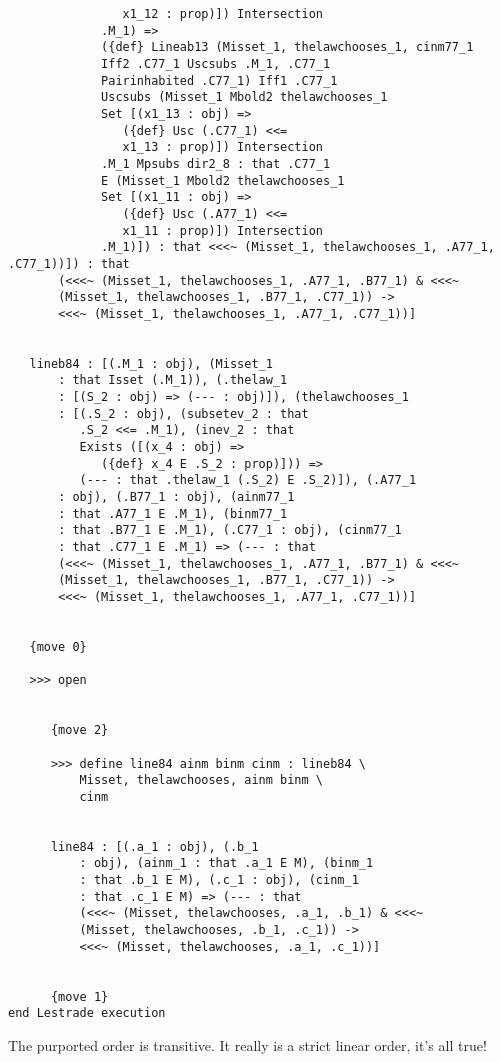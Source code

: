\documentclass[12pt]{article}
\begin{document}
\begin{verbatim}
                x1_12 : prop)]) Intersection 
             .M_1) => 
             ({def} Lineab13 (Misset_1, thelawchooses_1, cinm77_1 
             Iff2 .C77_1 Uscsubs .M_1, .C77_1 
             Pairinhabited .C77_1) Iff1 .C77_1 
             Uscsubs (Misset_1 Mbold2 thelawchooses_1 
             Set [(x1_13 : obj) => 
                ({def} Usc (.C77_1) <<= 
                x1_13 : prop)]) Intersection 
             .M_1 Mpsubs dir2_8 : that .C77_1 
             E (Misset_1 Mbold2 thelawchooses_1 
             Set [(x1_11 : obj) => 
                ({def} Usc (.A77_1) <<= 
                x1_11 : prop)]) Intersection 
             .M_1)]) : that <<<~ (Misset_1, thelawchooses_1, .A77_1, .C77_1))]) : that 
       (<<<~ (Misset_1, thelawchooses_1, .A77_1, .B77_1) & <<<~ 
       (Misset_1, thelawchooses_1, .B77_1, .C77_1)) -> 
       <<<~ (Misset_1, thelawchooses_1, .A77_1, .C77_1))]


   lineb84 : [(.M_1 : obj), (Misset_1 
       : that Isset (.M_1)), (.thelaw_1 
       : [(S_2 : obj) => (--- : obj)]), (thelawchooses_1 
       : [(.S_2 : obj), (subsetev_2 : that 
          .S_2 <<= .M_1), (inev_2 : that 
          Exists ([(x_4 : obj) => 
             ({def} x_4 E .S_2 : prop)])) => 
          (--- : that .thelaw_1 (.S_2) E .S_2)]), (.A77_1 
       : obj), (.B77_1 : obj), (ainm77_1 
       : that .A77_1 E .M_1), (binm77_1 
       : that .B77_1 E .M_1), (.C77_1 : obj), (cinm77_1 
       : that .C77_1 E .M_1) => (--- : that 
       (<<<~ (Misset_1, thelawchooses_1, .A77_1, .B77_1) & <<<~ 
       (Misset_1, thelawchooses_1, .B77_1, .C77_1)) -> 
       <<<~ (Misset_1, thelawchooses_1, .A77_1, .C77_1))]


   {move 0}

   >>> open


      {move 2}

      >>> define line84 ainm binm cinm : lineb84 \
          Misset, thelawchooses, ainm binm \
          cinm


      line84 : [(.a_1 : obj), (.b_1 
          : obj), (ainm_1 : that .a_1 E M), (binm_1 
          : that .b_1 E M), (.c_1 : obj), (cinm_1 
          : that .c_1 E M) => (--- : that 
          (<<<~ (Misset, thelawchooses, .a_1, .b_1) & <<<~ 
          (Misset, thelawchooses, .b_1, .c_1)) -> 
          <<<~ (Misset, thelawchooses, .a_1, .c_1))]


      {move 1}
end Lestrade execution
\end{verbatim}

The purported order is transitive.  It really is a strict linear order, it's all true!
\end{document}
